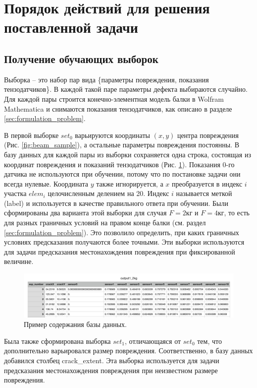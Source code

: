 \documentclass[a4paper,12pt]{article}
\theoremstyle{remark}
\begin{document}
	\newpage
	\section{Порядок действий для решения поставленной задачи}
	\label{sec:solving_problem}
	
	\subsection{Получение обучающих выборок}
	Выборка -- это набор пар вида \{параметры повреждения, показания тензодатчиков\}. В каждой такой паре параметры дефекта выбираются случайно. Для каждой пары строится конечно-элементная модель балки в Wolfram Mathematica и снимаются показания тензодатчиков, как описано в разделе \ref{sec:formulation_problem}.
	
	В первой выборке $set_0$ варьируются координаты $(x, y)$ центра повреждения (Рис. \ref{fig:beam_sample}), а остальные параметры повреждения постоянны. В базу данных для каждой пары из выборки сохраняется одна строка, состоящая из координат повреждения и показаний тензодатчиков (Рис. \ref{bd_sample}). Показания 0-го датчика не используются при обучении, потому что по постановке задачи они всегда нулевые. Координата $y$ также игнорируется, а $x$ преобразуется в индекс $i$ участка $elem_i$ целочисленным делением на 20. Индекс $i$ называется меткой (label) и используется в качестве правильного ответа при обучении. Были сформированы два варианта этой выборки для случая $F = 2\text{кг}$ и $F = 4\text{кг}$, то есть для разных граничных условий на правом конце балки (см. раздел \ref{sec:formulation_problem}). Это позволило определить, при каких граничных условиях предсказания получаются более точными. Эти выборки используются для задачи предсказания местонахождения повреждения при фиксированной величине.
	\begin{figure}[h]
		\includegraphics[width=\textwidth]{db_sample.png}
		\caption{Пример содержания базы данных.}
		\label{bd_sample}
	\end{figure}

	Была также сформирована выборка $set_1$, отличающаяся от $set_0$ тем, что дополнительно варьировался размер повреждения. 	Соответственно, в базу данных добавился столбец crack\_extent. Эта выборка используется для задачи предсказания местонахождения повреждения при неизвестном размере повреждения.
 
\end{document}
